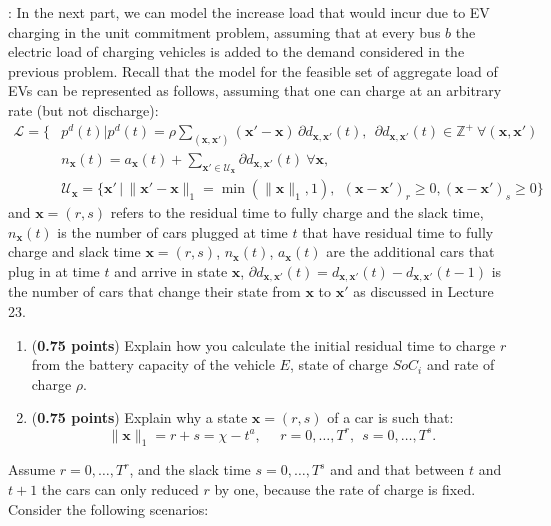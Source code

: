 \documentclass[11pt]{exam}
\begin{document}
\begin{questions}
\begin{parts}
\end{parts}
\newpage 
{}: 
In the next part, we can model the increase load that would incur due to EV charging in the unit commitment problem, assuming that at every bus $b$ the electric load of charging vehicles is added to the demand considered in the previous problem.
Recall that the model for the feasible set of aggregate load of EVs can be represented as follows, assuming that one can charge at an arbitrary rate (but not discharge):
\begin{align}\label{feasible}
\mathcal{L} = \bigg\{&p^d(t) | p^d(t) =  \rho   \!\!\! \sum_{(\bm{x},\bm{x}')}\!\!\! (\bm{x}' \!- \!\bm{x})\,\partial{d}_{\bm{x},\bm{x}'}(t), ~~ \partial{d}_{\bm{x},\bm{x}'}(t) \in \mathbb{Z}^+\  \forall (\bm{x}, \bm{x}')\\ 
	&n_{\bm{x}}(t)=a_{\bm{x}}(t)+\sum_{\bm{x}'\in\mathcal{U}_{\bm{x}}} \partial{d}_{\bm{x},\bm{x}'}(t) \ \forall \bm{x}, \nonumber \\ 
	& \mathcal{U}_{\bm{x}} = \big\{\bm{x}' \, |\, \|\bm{x}' - \bm{x}\|_1 = \min(\|\bm{x}\|_1, 1), ~~ (\bm{x}-\bm{x}')_r \geq 0, (\bm{x}-\bm{x}')_s \geq 0 \bigg\} 
\nonumber
\end{align}
and $\bm x=(r,s)$ refers to the residual time to fully charge and the slack time, $n_{\bm x}(t)$ is the number of cars plugged at time $t$ that have residual time to fully charge and  slack time $\bm x=(r,s)$, $n_{\bm x}(t)$, $a_{\bm x}(t)$ are the additional cars that plug in at time $t$ and arrive in state $\bm x$, $\partial{d}_{\bm{x},\bm{x}'}(t)={d}_{\bm{x},\bm{x}'}(t)-{d}_{\bm{x},\bm{x}'}(t-1)$ is the number of cars that change their state from $\bm x$ to $\bm x'$ as discussed in Lecture 23.
\begin{enumerate}
    \item (\textbf{0.75 points}) Explain how you calculate the initial residual time to charge $r$ from the battery capacity of the vehicle $E$, state of charge $SoC_i$  and rate of charge $\rho$. 
   \item (\textbf{0.75 points}) Explain why a state $\bm x=(r,s)$ of a car is such that:
   \[\|\bm x\|_1=r+s=\chi-t^a,~~~~~~r=0,\ldots,T^r,~~s=0, \ldots, T^s.\]
\end{enumerate}
Assume $r=0,\ldots,T^r$, and the slack time $s=0, \ldots, T^s$ and and that between $t$ and $t+1$ the cars can only reduced $r$ by one, because the rate of charge is fixed. 
Consider the following scenarios: 
\begin{enumerate}

\end{enumerate}
\end{questions}
\end{document}
